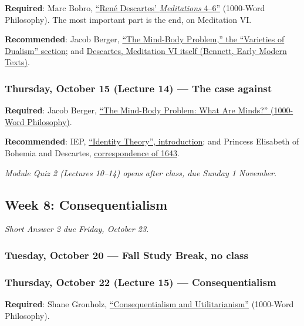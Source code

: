 \documentclass[
  letterpaper,
  DIV=11,
  numbers=noendperiod]{scrartcl}
\begin{document}
\textbf{Required}: Marc Bobro,
\href{https://1000wordphilosophy.com/2018/08/05/descartes-meditations-4-6/}{``René
Descartes' \emph{Meditations} 4--6''} (1000-Word Philosophy). The most
important part is the end, on Meditation VI.

\textbf{Recommended}: Jacob Berger,
\href{https://1000wordphilosophy.com/2024/02/03/mind-body-problem/}{``The
Mind-Body Problem,'' the ``Varieties of Dualism'' section}; and
\href{https://www.earlymoderntexts.com/assets/pdfs/descartes1641.pdf}{Descartes,
Meditation VI itself (Bennett, Early Modern Texts)}.

\subsubsection{Thursday, October 15 (Lecture 14) --- The case
against}\label{thursday-october-15-lecture-14-the-case-against}

\textbf{Required}: Jacob Berger,
\href{https://1000wordphilosophy.com/2024/02/03/mind-body-problem/}{``The
Mind-Body Problem: What Are Minds?'' (1000-Word Philosophy)}.

\textbf{Recommended}: IEP,
\href{https://iep.utm.edu/identity/}{``Identity Theory'', introduction};
and Princess Elisabeth of Bohemia and Descartes,
\href{https://www.earlymoderntexts.com/assets/pdfs/descelis.pdf}{correspondence
of 1643}.

\emph{Module Quiz 2 (Lectures 10--14) opens after class, due Sunday 1
November.}

\subsection{Week 8: Consequentialism}\label{week-8-consequentialism}

\emph{Short Answer 2 due Friday, October 23.}

\subsubsection{Tuesday, October 20 --- Fall Study Break, no
class}\label{tuesday-october-20-fall-study-break-no-class}

\subsubsection{Thursday, October 22 (Lecture 15) ---
Consequentialism}\label{thursday-october-22-lecture-15-consequentialism}

\textbf{Required}: Shane Gronholz,
\href{https://1000wordphilosophy.com/2014/05/15/consequentialism/}{``Consequentialism
and Utilitarianism''} (1000-Word Philosophy).
\end{document}
